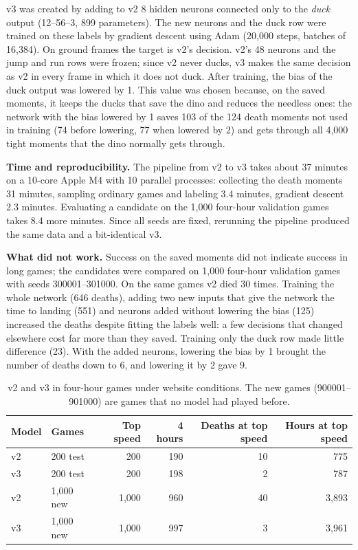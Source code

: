 \documentclass[11pt,a4paper]{article}
\begin{document}
v3 was created by adding to v2 8 hidden neurons connected only to the \emph{duck} output (12--56--3, 899 parameters). The new neurons and the duck row were trained on these labels by gradient descent using Adam \cite{kingma2015} (20,000 steps, batches of 16,384). On ground frames the target is v2's decision. v2's 48 neurons and the jump and run rows were frozen; since v2 never ducks, v3 makes the same decision as v2 in every frame in which it does not duck. After training, the bias of the duck output was lowered by 1. This value was chosen because, on the saved moments, it keeps the ducks that save the dino and reduces the needless ones: the network with the bias lowered by 1 saves 103 of the 124 death moments not used in training (74 before lowering, 77 when lowered by 2) and gets through all 4,000 tight moments that the dino normally gets through.

\textbf{Time and reproducibility.} The pipeline from v2 to v3 takes about 37 minutes on a 10-core Apple M4 with 10 parallel processes: collecting the death moments 31 minutes, sampling ordinary games and labeling 3.4 minutes, gradient descent 2.3 minutes. Evaluating a candidate on the 1,000 four-hour validation games takes 8.4 more minutes. Since all seeds are fixed, rerunning the pipeline produced the same data and a bit-identical v3.

\textbf{What did not work.} Success on the saved moments did not indicate success in long games; the candidates were compared on 1,000 four-hour validation games with seeds 300001--301000. On the same games v2 died 30 times. Training the whole network (646 deaths), adding two new inputs that give the network the time to landing (551) and neurons added without lowering the bias (125) increased the deaths despite fitting the labels well: a few decisions that changed elsewhere cost far more than they saved. Training only the duck row made little difference (23). With the added neurons, lowering the bias by 1 brought the number of deaths down to 6, and lowering it by 2 gave 9.

\begin{table}[!htbp]
  \centering
  \small
  \caption{v2 and v3 in four-hour games under website conditions. The new games (900001--901000) are games that no model had played before.}
  \label{tab:v3}
  \begin{tabular}{@{}l l r r r r@{}}
    \toprule
    Model & Games & Top speed & 4 hours & Deaths at top speed & Hours at top speed \\
    \midrule
    v2 & 200 test & 200 & 190 & 10 & 775 \\
    v3 & 200 test & 200 & 198 & 2 & 787 \\
    v2 & 1,000 new & 1,000 & 960 & 40 & 3,893 \\
    v3 & 1,000 new & 1,000 & 997 & 3 & 3,961 \\
    \bottomrule
  \end{tabular}
\end{table}
\FloatBarrier
\end{document}
